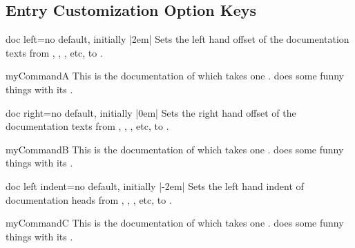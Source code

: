 \clearpage
\subsection{Entry Customization Option Keys}


\begin{docTcbKey}{doc left}{=}{no default, initially |2em|}
  Sets the left hand offset of the documentation texts from
  , , , etc, to .
\begin{dispExample}
\begin{docCommand*}[doc left=2cm,doc left indent=-2cm]{myCommandA}{}
  This is the documentation of  which takes one .
   does some funny things with its .
\end{docCommand*}
\end{dispExample}
\end{docTcbKey}

\begin{docTcbKey}{doc right}{=}{no default, initially |0em|}
  Sets the right hand offset of the documentation texts from
  , , , etc, to .
\begin{dispExample}
\begin{docCommand*}[doc right=2cm]{myCommandB}{}
  This is the documentation of  which takes one .
   does some funny things with its .
\end{docCommand*}
\end{dispExample}
\end{docTcbKey}

\begin{docTcbKey}{doc left indent}{=}{no default, initially |-2em|}
  Sets the left hand indent of documentation heads from
  , , , etc, to .
\begin{dispExample}
\begin{docCommand*}[doc left indent=2cm]{myCommandC}{}
  This is the documentation of  which takes one .
   does some funny things with its .
\end{docCommand*}
\end{dispExample}
\end{docTcbKey}


